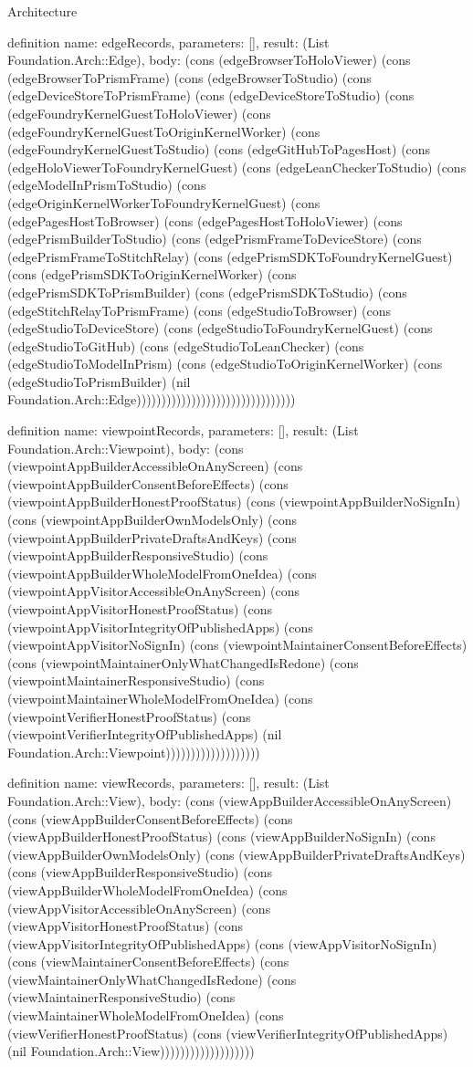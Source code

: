 \begin{lexlean}{Architecture}
\begin{semanticmodule}
definition{
  name: edgeRecords,
  parameters: [],
  result: (List Foundation.Arch::Edge),
  body: (cons (edgeBrowserToHoloViewer) (cons (edgeBrowserToPrismFrame) (cons (edgeBrowserToStudio) (cons (edgeDeviceStoreToPrismFrame) (cons (edgeDeviceStoreToStudio) (cons (edgeFoundryKernelGuestToHoloViewer) (cons (edgeFoundryKernelGuestToOriginKernelWorker) (cons (edgeFoundryKernelGuestToStudio) (cons (edgeGitHubToPagesHost) (cons (edgeHoloViewerToFoundryKernelGuest) (cons (edgeLeanCheckerToStudio) (cons (edgeModelInPrismToStudio) (cons (edgeOriginKernelWorkerToFoundryKernelGuest) (cons (edgePagesHostToBrowser) (cons (edgePagesHostToHoloViewer) (cons (edgePrismBuilderToStudio) (cons (edgePrismFrameToDeviceStore) (cons (edgePrismFrameToStitchRelay) (cons (edgePrismSDKToFoundryKernelGuest) (cons (edgePrismSDKToOriginKernelWorker) (cons (edgePrismSDKToPrismBuilder) (cons (edgePrismSDKToStudio) (cons (edgeStitchRelayToPrismFrame) (cons (edgeStudioToBrowser) (cons (edgeStudioToDeviceStore) (cons (edgeStudioToFoundryKernelGuest) (cons (edgeStudioToGitHub) (cons (edgeStudioToLeanChecker) (cons (edgeStudioToModelInPrism) (cons (edgeStudioToOriginKernelWorker) (cons (edgeStudioToPrismBuilder) (nil Foundation.Arch::Edge))))))))))))))))))))))))))))))))
}

definition{
  name: viewpointRecords,
  parameters: [],
  result: (List Foundation.Arch::Viewpoint),
  body: (cons (viewpointAppBuilderAccessibleOnAnyScreen) (cons (viewpointAppBuilderConsentBeforeEffects) (cons (viewpointAppBuilderHonestProofStatus) (cons (viewpointAppBuilderNoSignIn) (cons (viewpointAppBuilderOwnModelsOnly) (cons (viewpointAppBuilderPrivateDraftsAndKeys) (cons (viewpointAppBuilderResponsiveStudio) (cons (viewpointAppBuilderWholeModelFromOneIdea) (cons (viewpointAppVisitorAccessibleOnAnyScreen) (cons (viewpointAppVisitorHonestProofStatus) (cons (viewpointAppVisitorIntegrityOfPublishedApps) (cons (viewpointAppVisitorNoSignIn) (cons (viewpointMaintainerConsentBeforeEffects) (cons (viewpointMaintainerOnlyWhatChangedIsRedone) (cons (viewpointMaintainerResponsiveStudio) (cons (viewpointMaintainerWholeModelFromOneIdea) (cons (viewpointVerifierHonestProofStatus) (cons (viewpointVerifierIntegrityOfPublishedApps) (nil Foundation.Arch::Viewpoint)))))))))))))))))))
}

definition{
  name: viewRecords,
  parameters: [],
  result: (List Foundation.Arch::View),
  body: (cons (viewAppBuilderAccessibleOnAnyScreen) (cons (viewAppBuilderConsentBeforeEffects) (cons (viewAppBuilderHonestProofStatus) (cons (viewAppBuilderNoSignIn) (cons (viewAppBuilderOwnModelsOnly) (cons (viewAppBuilderPrivateDraftsAndKeys) (cons (viewAppBuilderResponsiveStudio) (cons (viewAppBuilderWholeModelFromOneIdea) (cons (viewAppVisitorAccessibleOnAnyScreen) (cons (viewAppVisitorHonestProofStatus) (cons (viewAppVisitorIntegrityOfPublishedApps) (cons (viewAppVisitorNoSignIn) (cons (viewMaintainerConsentBeforeEffects) (cons (viewMaintainerOnlyWhatChangedIsRedone) (cons (viewMaintainerResponsiveStudio) (cons (viewMaintainerWholeModelFromOneIdea) (cons (viewVerifierHonestProofStatus) (cons (viewVerifierIntegrityOfPublishedApps) (nil Foundation.Arch::View)))))))))))))))))))
}


\end{semanticmodule}
\end{lexlean}
